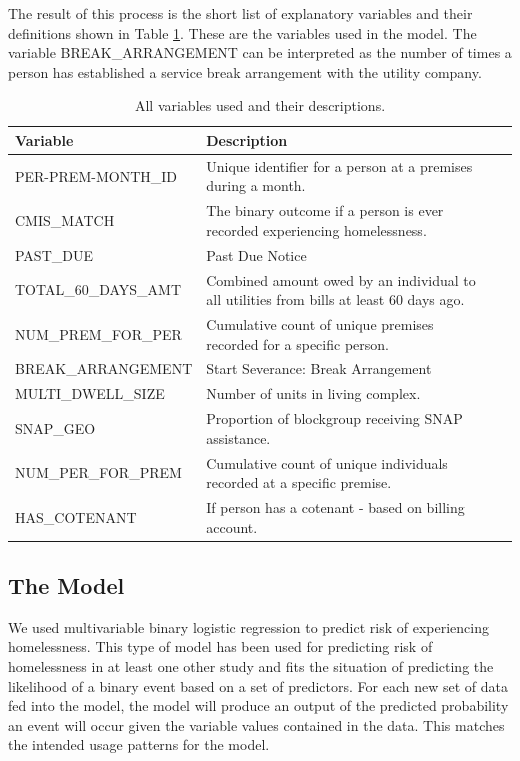 \documentclass[10pt,letterpaper]{article}
\newcommand{\red}[1]{{\color{red}{#1}}}
\begin{document}
The result of this process is the short list of explanatory variables and their definitions shown in Table \ref{tbl:varsUsed}. These are the variables used in the model. The variable BREAK\_ARRANGEMENT can be interpreted as the number of times a person has established a service break arrangement with the utility company.

\red{update}
\begin{table}[htb]
    \centering
    \begin{tabular}{l p{10cm} l p{16cm}}
        \toprule
        Variable &                  Description \\
        \midrule
        PER-PREM-MONTH\_ID & Unique identifier for a person at a premises during a month. \\
        CMIS\_MATCH & The binary outcome if a person is ever recorded experiencing homelessness. \\
        PAST\_DUE & Past Due Notice \\
        TOTAL\_60\_DAYS\_AMT & Combined amount owed by an individual to all utilities from bills at least 60 days ago. \\
        NUM\_PREM\_FOR\_PER & Cumulative count of unique premises recorded for a specific person. \\
        BREAK\_ARRANGEMENT & Start Severance: Break Arrangement \\
        MULTI\_DWELL\_SIZE & Number of units in living complex. \\
        SNAP\_GEO & Proportion of blockgroup receiving SNAP assistance. \\
        NUM\_PER\_FOR\_PREM & Cumulative count of unique individuals recorded at a specific premise. \\
        HAS\_COTENANT & If person has a cotenant - based on billing account. \\
        \midrule
    \end{tabular}
    \caption[Variables Used]{All variables used and their descriptions.}
    \label{tbl:varsUsed}
\end{table}

\subsection*{The Model}
We used multivariable binary logistic regression to predict risk of experiencing homelessness. This type of model has been used for predicting risk of homelessness in at least one other study \cite{van2009longitudinal} and fits the situation of predicting the likelihood of a binary event based on a set of predictors. For each new set of data fed into the model, the model will produce an output of the predicted probability an event will occur given the variable values contained in the data. This matches the intended usage patterns for the model. 
\end{document}
